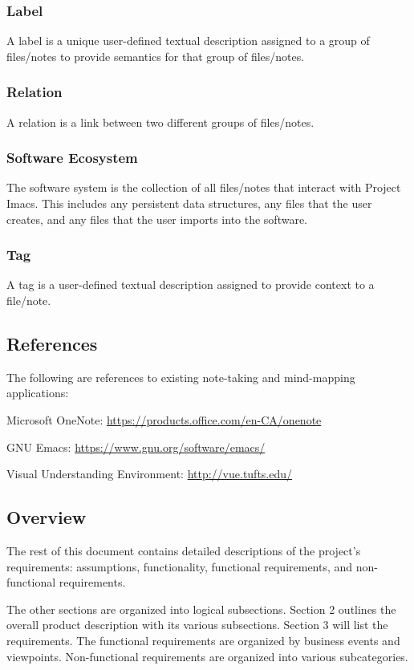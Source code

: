 \documentclass{article}
\begin{document}
\subsubsection{Label}
A label is a unique user-defined textual description assigned to a group of files/notes to provide semantics for that group of files/notes.

\subsubsection{Relation}
A relation is a link between two different groups of files/notes.

\subsubsection{Software Ecosystem}
The software system is the collection of all files/notes that interact with Project Imacs. This includes any persistent data structures, any files that the user creates, and any files that the user imports into the software.

\subsubsection{Tag}
A tag is a user-defined textual description assigned to provide context to a file/note.

\subsection{References}
The following are references to existing note-taking and mind-mapping applications:

Microsoft OneNote: \url{https://products.office.com/en-CA/onenote}

GNU Emacs: \url{https://www.gnu.org/software/emacs/}

Visual Understanding Environment: \url{http://vue.tufts.edu/}

\subsection{Overview}
The rest of this document contains detailed descriptions of the project's requirements: assumptions, functionality, functional requirements, and non-functional requirements.

The other sections are organized into logical subsections. Section 2 outlines the overall product description with its various subsections. Section 3 will list the requirements. The functional requirements are organized by business events and viewpoints. Non-functional requirements are organized into various subcategories.
\end{document}
